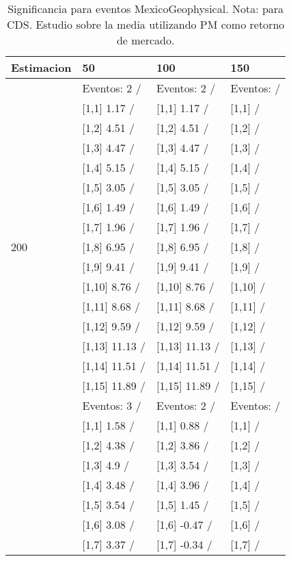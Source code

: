 \begin{table}

\caption{Significancia para eventos MexicoGeophysical. Nota: para CDS. Estudio sobre la media utilizando PM como retorno de mercado.}
\centering
\begin{tabular}[t]{llll}
\toprule
Estimacion & 50 & 100 & 150\\
\midrule
 & Eventos:  2 / & Eventos:  2 / & Eventos:   /\\
 & {}[1,1] 1.17  / & {}[1,1] 1.17  / & {}[1,1]  /\\
 & {}[1,2] 4.51  / & {}[1,2] 4.51  / & {}[1,2]  /\\
 & {}[1,3] 4.47  / & {}[1,3] 4.47  / & {}[1,3]  /\\
 & {}[1,4] 5.15  / & {}[1,4] 5.15  / & {}[1,4]  /\\
\addlinespace
 & {}[1,5] 3.05  / & {}[1,5] 3.05  / & {}[1,5]  /\\
 & {}[1,6] 1.49  / & {}[1,6] 1.49  / & {}[1,6]  /\\
 & {}[1,7] 1.96  / & {}[1,7] 1.96  / & {}[1,7]  /\\
200 & {}[1,8] 6.95  / & {}[1,8] 6.95  / & {}[1,8]  /\\
 & {}[1,9] 9.41  / & {}[1,9] 9.41  / & {}[1,9]  /\\
\addlinespace
 & {}[1,10] 8.76  / & {}[1,10] 8.76  / & {}[1,10]  /\\
 & {}[1,11] 8.68  / & {}[1,11] 8.68  / & {}[1,11]  /\\
 & {}[1,12] 9.59  / & {}[1,12] 9.59  / & {}[1,12]  /\\
 & {}[1,13] 11.13  / & {}[1,13] 11.13  / & {}[1,13]  /\\
 & {}[1,14] 11.51  / & {}[1,14] 11.51  / & {}[1,14]  /\\
\addlinespace
 & {}[1,15] 11.89  / & {}[1,15] 11.89  / & {}[1,15]  /\\
 & Eventos:  3 / & Eventos:  2 / & Eventos:   /\\
 & {}[1,1] 1.58  / & {}[1,1] 0.88  / & {}[1,1]  /\\
 & {}[1,2] 4.38  / & {}[1,2] 3.86  / & {}[1,2]  /\\
 & {}[1,3] 4.9  / & {}[1,3] 3.54  / & {}[1,3]  /\\
\addlinespace
 & {}[1,4] 3.48  / & {}[1,4] 3.96  / & {}[1,4]  /\\
 & {}[1,5] 3.54  / & {}[1,5] 1.45  / & {}[1,5]  /\\
 & {}[1,6] 3.08  / & {}[1,6] -0.47  / & {}[1,6]  /\\
 & {}[1,7] 3.37  / & {}[1,7] -0.34  / & {}[1,7]  /\\

\end{tabular}
\end{table}
